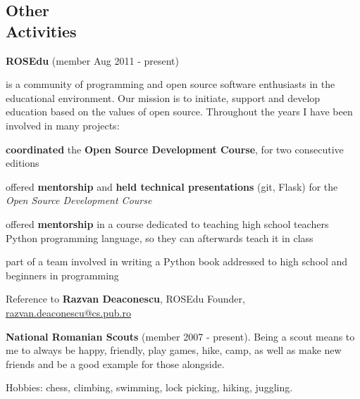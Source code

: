 \documentclass[margin,line]{resume}
\begin{document}
\begin{resume}
    \section{\mysidestyle Other\\Activities}

    \textbf{ROSEdu} (member Aug 2011 - present)
    {\fontsize{2.65mm}{1em}\selectfont
      is a community of
      programming and open source software enthusiasts in the educational environment. Our mission is to
      initiate, support and develop education based on the values of open source.\vspace{1mm}
      Throughout the years I have been involved in many projects:
      \begin{list2}
          \item \textbf{coordinated} the \textbf{Open Source Development Course}, for two consecutive editions
          \item offered \textbf{mentorship} and \textbf{held technical presentations} (git, Flask) for the \textit{Open Source Development Course}
          \item offered \textbf{mentorship} in a course dedicated to teaching high school teachers Python programming language, so they can afterwards teach it in class
          \item part of a team involved in writing a Python book addressed to high school and beginners in programming
      \end{list2}\vspace{-3.5mm}
      Reference to \textbf{Razvan Deaconescu}, ROSEdu Founder, \href{mailto:razvan.deaconescu@cs.pub.ro}{razvan.deaconescu@cs.pub.ro}
    }\vspace{-1mm}

    \textbf{National Romanian Scouts} (member 2007 - present).
    {\fontsize{2.65mm}{1em}\selectfont
      Being a scout means to me to always be happy, friendly, play games, hike, camp, as well as make new friends and be a good example for those alongside.
    }\vspace{-1mm}

    Hobbies: chess, climbing, swimming, lock picking, hiking, juggling.



\end{resume}
\end{document}
